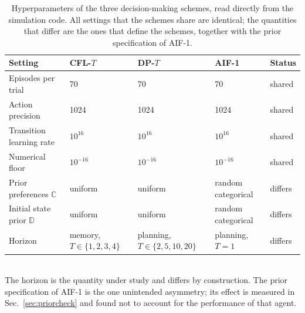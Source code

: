 \begin{table}[ht]
\centering
\small
\caption{Hyperparameters of the three decision-making schemes, read directly from the simulation code. All settings that the schemes share are identical; the quantities that differ are the ones that define the schemes, together with the prior specification of AIF-1.}
\label{tab:hyperparams}
\begin{tabular}{lllll}
\toprule
Setting & CFL-$T$ & DP-$T$ & AIF-1 & Status \\
\midrule
Episodes per trial & 70 & 70 & 70 & shared \\
Action precision & 1024 & 1024 & 1024 & shared \\
Transition learning rate & $10^{16}$ & $10^{16}$ & $10^{16}$ & shared \\
Numerical floor & $10^{-16}$ & $10^{-16}$ & $10^{-16}$ & shared \\
Prior preferences $\mathbb{C}$ & uniform & uniform & random categorical & differs \\
Initial state prior $\mathbb{D}$ & uniform & uniform & random categorical & differs \\
Horizon & memory, $T \in \{1,2,3,4\}$ & planning, $T \in \{2,5,10,20\}$ & planning, $T = 1$ & differs \\
\bottomrule
\end{tabular}
\\[4pt]\footnotesize{The horizon is the quantity under study and differs by construction. The prior specification of AIF-1 is the one unintended asymmetry; its effect is measured in Sec.~\ref{sec:priorcheck} and found not to account for the performance of that agent.}
\end{table}
